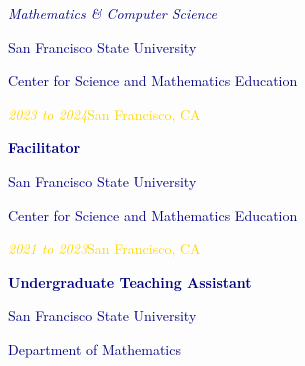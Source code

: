 \documentclass[hidelinks, 10pt]{article}
\begin{document}
\begin{textblock}{4}
    \scriptsize\textcolor{navy}{\scriptsize\emph{Mathematics \& Computer Science}}

    \vspace{0.5mm}

    \footnotesize\textcolor{navy}{\scriptsize San Francisco State University}

    \vspace{0.5mm}

    \scriptsize\textcolor{navy}{\scriptsize Center for Science and Mathematics Education}

    \vspace{0.5mm}

    \scriptsize\textcolor{gold}{\scriptsize\emph{2023 to 2024}\hfill San
        Francisco, CA}


    \vspace{1mm}

    \footnotesize\textcolor{navy}{\scriptsize\textbf{Facilitator}}

    \vspace{0.5mm}

    \footnotesize\textcolor{navy}{\scriptsize San Francisco State University}

    \vspace{0.5mm}

    \scriptsize\textcolor{navy}{\scriptsize Center for Science and Mathematics Education}

    \vspace{0.5mm}

    \scriptsize\textcolor{gold}{\scriptsize\emph{2021 to 2023}\hfill San
        Francisco, CA}

    \vspace{1mm}

    \footnotesize\textcolor{navy}{\scriptsize\textbf{Undergraduate Teaching Assistant}}

    \vspace{0.5mm}

    \footnotesize\textcolor{navy}{\scriptsize San Francisco State University}

    \vspace{0.5mm}

    \scriptsize\textcolor{navy}{\scriptsize Department of Mathematics}

    \vspace{0.5mm}


\end{textblock}
\end{document}
